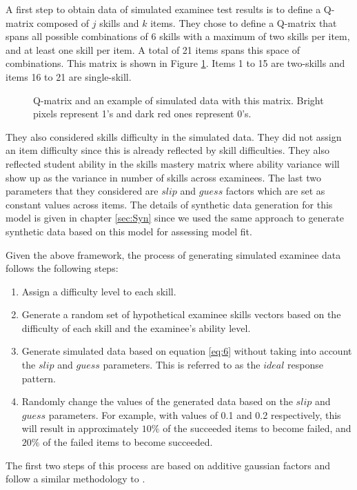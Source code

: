 A first step to obtain data of simulated examinee test results is to define a Q-matrix composed of $j$ skills and $k$ items. They chose to define a Q-matrix that spans all possible combinations of 6 skills with a maximum of two skills per item, and at least one skill per item. A total of 21 items spans this space of combinations. This matrix is shown in Figure \ref{figqmatrixandResutM}. Items 1 to 15 are two-skills and items 16 to 21 are single-skill. 

\begin{figure}[ht]
\centering

\quad
\caption{Q-matrix and an example of simulated data with this matrix.  Bright pixels represent 1's and dark red ones represent 0's.}
\label{figqmatrixandResutM}
\end{figure}

They also considered skills difficulty in the simulated data. They did not assign an item difficulty since this is already reflected by skill difficulties. They also reflected student ability in the skills mastery matrix where ability variance will show up as the variance in number of skills across examinees. The last two parameters that they considered are $\mathit{slip}$ and $\mathit{guess}$ factors which are set as constant values across items. The details of synthetic data generation for this model is given in chapter \ref{sec:Syn} since we used the same approach to generate synthetic data based on this model for assessing model fit.

Given the above framework, the process of generating simulated examinee data follows the following steps:
\begin{enumerate}
\item Assign a difficulty level to each skill.
\item Generate a random set of hypothetical examinee skills vectors based on the difficulty of each skill and the examinee\textquoteright{}s ability level. 
\item Generate simulated data based on equation \ref{eq:6} without taking into account the $\mathit{slip}$ and $\mathit{guess}$ parameters. This is referred to as the $ideal$ response pattern.
\item Randomly change the values of the generated data based on the $\mathit{slip}$ and $\mathit{guess}$ parameters. For example, with values of 0.1 and 0.2 respectively, this will result in approximately $10\%$ of the succeeded items to become failed, and $20\%$ of the failed items to become succeeded.
\end{enumerate}
The first two steps of this process are based on additive gaussian factors and follow a similar methodology to \citep{desmarais2011conditions}.

